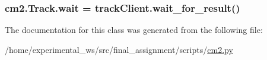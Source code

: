 \subsubsection[{\texorpdfstring{wait}{wait}}]{\setlength{\rightskip}{0pt plus 5cm}cm2.\+Track.\+wait = track\+Client.\+wait\+\_\+for\+\_\+result()\hspace{0.3cm}{\ttfamily [static]}}\hypertarget{classcm2_1_1Track_a06c6786fdec044086a2cfab42ee0feaa}{}\label{classcm2_1_1Track_a06c6786fdec044086a2cfab42ee0feaa}


The documentation for this class was generated from the following file\+:\begin{DoxyCompactItemize}
\item 
/home/experimental\+\_\+ws/src/final\+\_\+assignment/scripts/\hyperlink{cm2_8py}{cm2.\+py}\end{DoxyCompactItemize}

